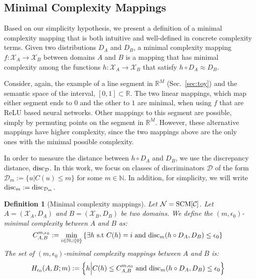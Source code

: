 \documentclass{article} %
\newtheorem{defn}{Definition}
\newcommand{\disc}{\textnormal{disc}}
\begin{document}
\subsection{Minimal Complexity Mappings}

 

Based on our simplicity hypothesis, we present a definition of a minimal complexity mapping that is both intuitive and well-defined in concrete complexity terms. Given two distributions $D_A$ and $D_B$, a minimal complexity mapping $f:\mathcal{X}_A\rightarrow \mathcal{X}_B$ between domains $A$ and $B$ is a mapping that has minimal complexity among the functions $h:\mathcal{X}_A\rightarrow \mathcal{X}_B$ that satisfy $h \circ D_A \approx D_B$. 

Consider, again, the example of a line segment in $\mathbb{R}^M$ (Sec.~\ref{sec:toy}) and the semantic space of the interval, $[0,1]\subset \mathbb{R}$. The two linear mappings, which map either segment ends to $0$ and the other to $1$ are minimal, when using $f$ that are ReLU based neural networks. Other mappings to this segment are possible, simply by permuting points on the segment in $\mathbb{R}^M$. However, these alternative mappings have higher complexity, since the two mappings above are the only ones with the minimal possible complexity.
 

In order to measure the distance between $h \circ D_A$ and $D_B$, we use the discrepancy distance, $\disc_{\mathcal{D}}$. In this work, we focus on classes of discriminators $\mathcal{D}$ of the form $\mathcal{D}_m := \{u \vert C(u) \leq m\}$ for some $m \in \mathbb{N}$. In addition, for simplicity, we will write $\disc_m := \disc_{\mathcal{D}_m}$.

 

\begin{defn}[Minimal complexity mappings]\label{def:semantic} Let $\mathcal{N} = \textnormal{SCM}[\mathcal{C}]$. Let $A = (\mathcal{X}_A,D_A)$ and $B = (\mathcal{X}_B,D_B)$ be two domains. We define the $(m,\epsilon_0)$-minimal complexity between $A$ and $B$ as:
\begin{equation}
C^{m,\epsilon_0}_{A,B}  := \min_{i \in \mathbb{N}\cup \{0\}}  \left\{ \exists h \textnormal{ s.t } C(h)=i \textnormal{ and } \disc_{m}(h \circ D_A, D_B) \leq \epsilon_0 \right\}
\end{equation}
The set of $(m,\epsilon_0)$-minimal complexity mappings between $A$ and $B$ is: 
\begin{equation}
H_{\epsilon_0}(A,B;m) := \left\{h \Big\vert C(h) \leq C^{m,\epsilon_0}_{A,B} \textnormal{ and }  \disc_{m}(h \circ D_A, D_B) \leq \epsilon_0 \right\}
\end{equation}
\end{defn}
\end{document}
